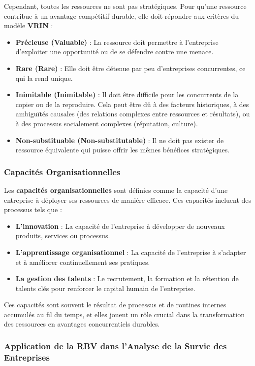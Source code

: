 \documentclass[a4paper,12pt]{report}
\begin{document}
Cependant, toutes les ressources ne sont pas stratégiques. Pour qu'une ressource contribue à un avantage compétitif durable, elle doit répondre aux critères du modèle \textbf{VRIN} :
\begin{itemize}
    \item \textbf{Précieuse (Valuable)} : La ressource doit permettre à l'entreprise d'exploiter une opportunité ou de se défendre contre une menace.
    \item \textbf{Rare (Rare)} : Elle doit être détenue par peu d'entreprises concurrentes, ce qui la rend unique.
    \item \textbf{Inimitable (Inimitable)} : Il doit être difficile pour les concurrents de la copier ou de la reproduire. Cela peut être dû à des facteurs historiques, à des ambiguïtés causales (des relations complexes entre ressources et résultats), ou à des processus socialement complexes (réputation, culture).
    \item \textbf{Non-substituable (Non-substitutable)} : Il ne doit pas exister de ressource équivalente qui puisse offrir les mêmes bénéfices stratégiques.
\end{itemize}

\subsubsection{Capacités Organisationnelles}

Les \textbf{capacités organisationnelles} sont définies comme la capacité d'une entreprise à déployer ses ressources de manière efficace. Ces capacités incluent des processus tels que :
\begin{itemize}
    \item \textbf{L'innovation} : La capacité de l'entreprise à développer de nouveaux produits, services ou processus.
    \item \textbf{L'apprentissage organisationnel} : La capacité de l'entreprise à s'adapter et à améliorer continuellement ses pratiques.
    \item \textbf{La gestion des talents} : Le recrutement, la formation et la rétention de talents clés pour renforcer le capital humain de l'entreprise.
\end{itemize}
Ces capacités sont souvent le résultat de processus et de routines internes accumulés au fil du temps, et elles jouent un rôle crucial dans la transformation des ressources en avantages concurrentiels durables.

\subsubsection{Application de la RBV dans l'Analyse de la Survie des Entreprises}
\end{document}
